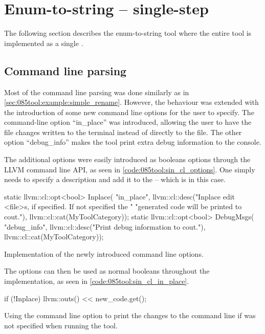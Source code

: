 \section{Enum-to-string -- single-step}
The following section describes the enum-to-string tool where the entire tool is implemented as a single .

\subsection{Command line parsing}
Most of the command line parsing was done similarly as in \cref{sec:085tool:example:simple_rename}. However, the behaviour was extended with the introduction of some new command line options for the user to specify.
The command-line option ``in\_place'' was introduced, allowing the user to have the file changes written to the terminal instead of directly to the file.
The other option ``debug\_info'' makes the tool print extra debug information to the console.

The additional options were easily introduced as booleans options through the LLVM command line API, as seen in \cref{code:085tool:sin_cl_options}. One simply needs to specify a description and add it to the  -- which is  in this case.

\begin{listing}[H]
    \begin{cppcode}
static llvm::cl::opt<bool> Inplace(
    "in_place",
    llvm::cl::desc("Inplace edit <file>s, if specified. If not specified the "
                   "generated code will be printed to cout."),
    llvm::cl::cat(MyToolCategory));
static llvm::cl::opt<bool> DebugMsgs(
    "debug_info", llvm::cl::desc("Print debug information to cout."),
    llvm::cl::cat(MyToolCategory));
    \end{cppcode}
    \caption{Implementation of the newly introduced command line options.}
    \label{code:085tool:sin_cl_options}
\end{listing}

The options can then be used as normal booleans throughout the implementation, as seen in \cref{code:085tool:sin_cl_in_place}.

\begin{listing}[H]
    \begin{cppcode}
if (!Inplace) {
    llvm::outs() << new_code.get();
}
    \end{cppcode}
    \caption{Using the  command line option to print the changes to the command line if  was not specified when running the tool.}
    \label{code:085tool:sin_cl_in_place}
\end{listing}

